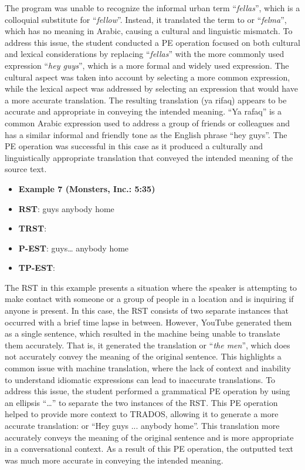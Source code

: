 \documentclass[english]{textolivre}
\begin{document}
The program was unable to recognize the informal urban term “\emph{fellas}”, which is a colloquial substitute for “\emph{fellow}”. Instead, it translated the term to  or “\emph{felma}”, which has no meaning in Arabic, causing a cultural and linguistic mismatch. To address this issue, the student conducted a PE operation focused on both cultural and lexical considerations by replacing “\emph{fellas}” with the more commonly used expression “\emph{hey guys}”, which is a more formal and widely used expression.  The cultural aspect was taken into account by selecting a more common expression, while the lexical aspect was addressed by selecting an expression that would have a more accurate translation. The resulting translation  (ya rifaq) appears to be accurate and appropriate in conveying the intended meaning. “Ya rafaq” is a common Arabic expression used to address a group of friends or colleagues and has a similar informal and friendly tone as the English phrase “hey guys”. The PE operation was successful in this case as it produced a culturally and linguistically appropriate translation that conveyed the intended meaning of the source text.

\begin{itemize}
\item \textbf{Example 7 (Monsters, Inc.: 5:35)}
\item \textbf{RST}: guys anybody home
\item \textbf{TRST}: 
\item \textbf{P-EST}: guys… anybody home
\item \textbf{TP-EST}: 
\end{itemize}

The RST in this example presents a situation where the speaker is attempting to make contact with someone or a group of people in a location and is inquiring if anyone is present. In this case, the RST consists of two separate instances that occurred with a brief time lapse in between. However, YouTube generated them as a single sentence, which resulted in the machine being unable to translate them accurately. That is, it generated the translation  or “\emph{the men}”, which does not accurately convey the meaning of the original sentence. This highlights a common issue with machine translation, where the lack of context and inability to understand idiomatic expressions can lead to inaccurate translations. To address this issue, the student performed a grammatical PE operation by using an ellipsis “…” to separate the two instances of the RST. This PE operation helped to provide more context to TRADOS, allowing it to generate a more accurate translation:  or “Hey guys ... anybody home”. This translation more accurately conveys the meaning of the original sentence and is more appropriate in a conversational context. As a result of this PE operation, the outputted text was much more accurate in conveying the intended meaning.
\end{document}

